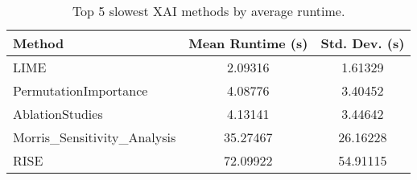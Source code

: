 \begin{table}[ht]
\centering
\begin{tabular}{lcc}
\hline
Method & Mean Runtime (s) & Std. Dev. (s) \\
\hline
LIME & 2.09316 & 1.61329 \\
PermutationImportance & 4.08776 & 3.40452 \\
AblationStudies & 4.13141 & 3.44642 \\
Morris_Sensitivity_Analysis & 35.27467 & 26.16228 \\
RISE & 72.09922 & 54.91115 \\
\hline
\end{tabular}
\caption{Top 5 slowest XAI methods by average runtime.}
\label{tab:slowest_runtime}
\end{table}
